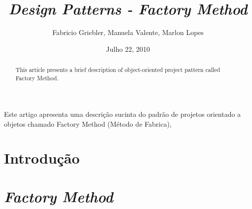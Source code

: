 \documentclass[]{article}
\begin{document}
\date{Julho 22, 2010}   

\sloppy

\title{\emph{Design Patterns - Factory Method}}
\author{Fabricio Griebler, Manuela Valente, Marlon Lopes}

\address{
	 Especialização em Tecnologias Aplicadas a Sistemas de Informação com Métodos Ágeis - 4ª Edição \\
         Uniritter \\
         Porto Alegre, RS \\
}

\maketitle

\pagestyle{plain}


\begin{resumo}

Este artigo apresenta uma descrição sucinta do padrão de projetos orientado a objetos chamado Factory Method (Método de Fabrica), 

\end{resumo}


\begin{abstract}

This article presents a brief description of object-oriented project pattern called Factory Method.

\end{abstract}

\setcounter{page}{1}

\section{Introdução}
\label{sec:introducao}


\section{\emph{Factory Method}}
\label{sec:factory1}


\newpage


\renewcommand{\bibname}{Referência Bibliografia}

\end{document}
